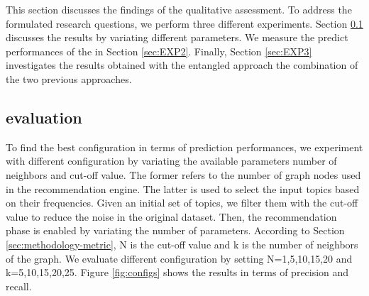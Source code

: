 This section discusses the findings of the qualitative assessment. To address the formulated research questions, we perform three different experiments. Section \ref{sec:EXP1} discusses the \CT results by variating different parameters.  We measure the predict performances of the \MNB in Section \ref{sec:EXP2}. Finally, Section \ref{sec:EXP3} investigates the results obtained with the entangled approach \ie the combination of the two previous approaches. 


\subsection{\CT evaluation} \label{sec:EXP1}
 \rqfirst
To find the best configuration in terms of prediction performances, we experiment with different \CT configuration by variating the available parameters \ie number of neighbors and cut-off value.  The former refers to the number of graph nodes used in the recommendation engine. The latter is used to select the input topics based on their frequencies. Given an initial set of topics, we filter them with the cut-off value to reduce the noise in the original dataset. Then, the recommendation phase is enabled by variating the number of parameters. According to Section \ref{sec:methodology-metric}, N is the cut-off value and k is the number of neighbors of the graph. We evaluate different configuration by setting N=1,5,10,15,20 and k=5,10,15,20,25. Figure \ref{fig:configs} shows the results  in terms of precision and recall. 


